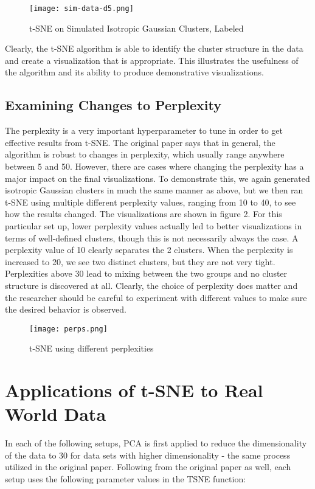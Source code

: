 \documentclass{article}
\begin{document}
\begin{figure}[H]
\caption{t-SNE on Simulated Isotropic Gaussian Clusters, Labeled}
\centering
\texttt{[image: sim-data-d5.png]}
\end{figure}

Clearly, the t-SNE algorithm is able to identify the cluster structure in the data and create a visualization that is appropriate. This illustrates the usefulness of the algorithm and its ability to produce demonstrative visualizations. 

\subsection*{Examining Changes to Perplexity}
The perplexity is a very important hyperparameter to tune in order to get effective results from t-SNE. The original paper says that in general, the algorithm is robust to changes in perplexity, which usually range anywhere between 5 and 50. However, there are cases where changing the perplexity has a major impact on the final visualizations. To demonstrate this, we again generated isotropic Gaussian clusters in much the same manner as above, but we then ran t-SNE using multiple different perplexity values, ranging from 10 to 40, to see how the results changed. The visualizations are shown in figure 2. For this particular set up, lower perplexity values actually led to better visualizations in terms of well-defined clusters, though this is not necessarily always the case. A perplexity value of 10 clearly separates the 2 clusters. When the perplexity is increased to 20, we see two distinct clusters, but they are not very tight. Perplexities above 30 lead to mixing between the two groups and no cluster structure is discovered at all. Clearly, the choice of perplexity does matter and the researcher should be careful to experiment with different values to make sure the desired behavior is observed.

\begin{figure}[H]
\caption{t-SNE using different perplexities}
\centering
\texttt{[image: perps.png]}
\end{figure}


\section*{Applications of t-SNE to Real World Data}

In each of the following setups, PCA is first applied to reduce the dimensionality of the data to 30 for data sets with higher dimensionality - the same process utilized in the original paper. Following from the original paper as well, each setup uses the following parameter values in the TSNE function:\newline
\end{document}
